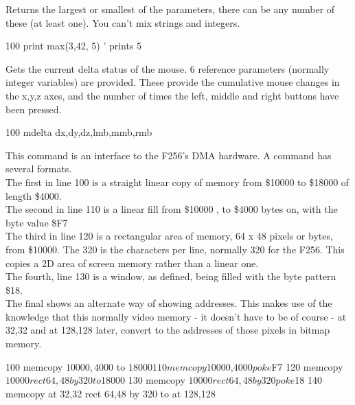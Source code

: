 \begin{entry}
Returns the largest or smallest of the parameters, there can be any number of these (at least one). You can’t mix strings and integers.

\begin{lstexample}
100 print max(3,42, 5)  ' prints 5
\end{lstexample}
\end{entry}

\begin{entry}
Gets the current delta status of the mouse. 6 reference parameters (normally integer variables) are provided. These provide the cumulative mouse changes in the x,y,z axes, and the number of times the left, middle and right buttons have been pressed.

\begin{lstexample}
100 mdelta dx,dy,dz,lmb,mmb,rmb
\end{lstexample}
\end{entry}

\begin{entry}
This command is an interface to the F256's DMA hardware. A  command has several formats. \\

The first in line 100 is a straight linear copy of memory from \$10000 to \$18000 of length \$4000.\\ The second in line 110 is a linear fill from \$10000 , to \$4000 bytes on, with the byte value \$F7 \\

The third in line 120 is a rectangular area of memory, 64 x 48 pixels or bytes, from \$10000. The 320 is the characters per line, normally 320 for the F256. This copies a 2D area of screen memory rather than a linear one. \\

The fourth, line 130 is a window, as defined, being filled with the byte pattern \$18. \\

The final shows an alternate way of showing addresses. This makes use of the knowledge that this normally video memory - it doesn't have to be of course - at 32,32 and at 128,128 later, convert to the addresses of those pixels in bitmap memory.

\begin{lstexample}
100 memcopy $10000,$4000 to $18000
110 memcopy $10000,$4000 poke $F7
120 memcopy $10000 rect 64,48 by 320 to $18000
130 memcopy $10000 rect 64,48 by 320 poke $18
140 memcopy at 32,32 rect 64,48 by 320 to at 128,128
\end{lstexample}
\end{entry}

